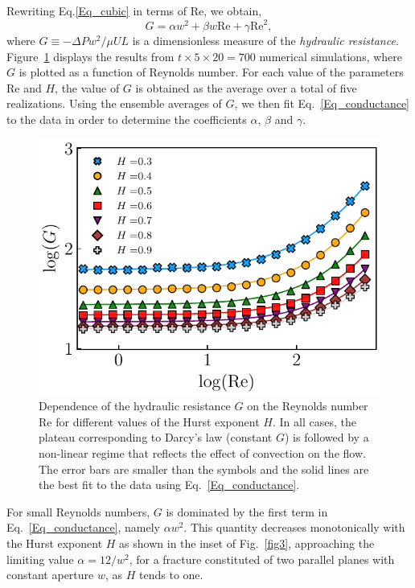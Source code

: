 \documentclass[aps,pre,
superscriptaddress,
twocolumn,
notitlepage,
10pt,]{revtex4-1}
\begin{document}
Rewriting Eq.\eqref{Eq_cubic} in terms of $\mathrm{Re}$, we obtain,
%
\begin{equation}
G = \alpha w^2 + \beta w \mathrm{Re} + \gamma \mathrm{Re}^{2},
\label{Eq_conductance}
\end{equation}
%
where $G \equiv -\Delta P w^{2}/ \mu U L$ is a dimensionless measure of the
{\it hydraulic resistance}. Figure~\ref{fig2} displays the results from
$t\times5\times20=700$ numerical simulations, where $G$ is plotted as a function
of Reynolds number. For each value of the parameters $\mathrm{Re}$ and $H$,
the value of $G$ is obtained as the average over a total of five
realizations. Using the ensemble averages of $G$, we then fit
Eq.~\eqref{Eq_conductance} to the data in order to determine the
coefficients  $\alpha$, $\beta$ and $\gamma$.

\begin{figure}[!h]
	\centering
	\includegraphics[width=0.99\columnwidth]{fig2.pdf} %
	\caption{ Dependence of the hydraulic resistance $G$ on the Reynolds number
		$\mathrm{Re}$ for different values of the Hurst exponent $H$. In all cases,
		the
		plateau corresponding to Darcy's law (constant $G$) is followed by a
		non-linear
		regime that reflects the effect of convection on the flow. The error bars are
		smaller than the symbols and the solid lines are the best fit to the data
		using
		Eq.~\eqref{Eq_conductance}.} \label{fig2} \end{figure}

For small Reynolds numbers, $G$ is dominated by the first term in
Eq.~\ref{Eq_conductance}, namely $\alpha w^2$. This quantity decreases
monotonically with the Hurst exponent $H$ as shown in the inset of
Fig.~\ref{fig3}, approaching the limiting value $\alpha = 12/w^2$, for a
fracture constituted  of two parallel planes with constant aperture $w$, as
$H$ tends to one.
\end{document}

